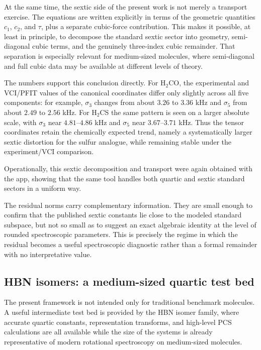 \documentclass[journal=jacsat,manuscript=article]{achemso}
\begin{document}
At the same time, the sextic side of the present work is not merely a
transport exercise. The equations are written explicitly in terms of the
geometric quantities $c_1$, $c_2$, and $\tau$, plus a separate cubic-force
contribution. This makes it possible, at least in principle, to decompose the
standard sextic sector into geometry, semi-diagonal cubic terms, and the
genuinely three-index cubic remainder. That separation is especially relevant
for medium-sized molecules, where semi-diagonal and full cubic data may be
available at different levels of theory.

The numbers support this conclusion directly. For H$_2$CO, the experimental
and VCI/PFIT values of the canonical coordinates differ only slightly across
all five components: for example, $\sigma_3$ changes from about $3.26$ to
$3.36$ kHz and $\sigma_5$ from about $2.49$ to $2.56$ kHz. For H$_2$CS the
same pattern is seen on a larger absolute scale, with $\sigma_3$ near
$4.81$--$4.86$ kHz and $\sigma_5$ near $3.67$--$3.71$ kHz. Thus the tensor
coordinates retain the chemically expected trend, namely a systematically
larger sextic distortion for the sulfur analogue, while remaining stable under
the experiment/VCI comparison.

Operationally, this sextic decomposition and transport were again obtained
with the app, showing that the same tool handles both quartic and sextic
standard sectors in a uniform way.

The residual norms carry complementary information. They are small enough to
confirm that the published sextic constants lie close to the modeled standard
subspace, but not so small as to suggest an exact algebraic identity at the
level of rounded spectroscopic parameters. This is precisely the regime in
which the residual becomes a useful spectroscopic diagnostic rather than a
formal remainder with no interpretative value.

\subsection{HBN isomers: a medium-sized quartic test bed}

The present framework is not intended only for traditional benchmark
molecules. A useful intermediate test bed is provided by the HBN isomer
family, where accurate quartic constants, representation transforms, and
high-level PCS calculations are all available while the size of the systems is
already representative of modern rotational spectroscopy on medium-sized
molecules.
\end{document}
